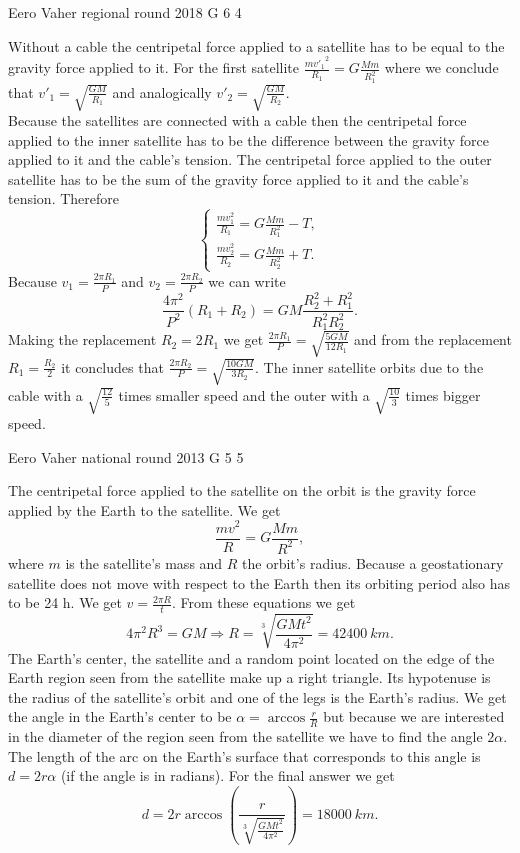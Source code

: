 \documentclass[11pt]{article}
\begin{document}
{Eero Vaher} %
{regional round} %
{2018} %
{G 6} %
{4} %
{

\ifEngSolution
Without a cable the centripetal force applied to a satellite has to be equal to the gravity force applied to it. For the first satellite $\frac{{mv'_1}^2}{R_1}=G\frac{Mm}{R_1^2}$ where we conclude that $v'_1=\sqrt{\frac{GM}{R_1}}$ and analogically $v'_2=\sqrt{\frac{GM}{R_2}}$.\\
Because the satellites are connected with a cable then the centripetal force applied to the inner satellite has to be the difference between the gravity force applied to it and the cable’s tension. The centripetal force applied to the outer satellite has to be the sum of the gravity force applied to it and the cable’s tension. Therefore
$$\begin{cases}
\frac{mv_1^2}{R_1}=G\frac{Mm}{R_1^2}-T,\\
\frac{mv_2^2}{R_2}=G\frac{Mm}{R_2^2}+T.
\end{cases}$$
Because $v_1=\frac{2\pi R_1}{P}$ and $v_2=\frac{2\pi R_2}{P}$ we can write 
$$\frac{4\pi^2}{P^2}\left(R_1+R_2\right)=GM\frac{R_2^2+R_1^2}{R_1^2R_2^2}.$$
Making the replacement $R_2=2R_1$ we get $\frac{2\pi R_1}{P}=\sqrt{\frac{5GM}{12R_1}}$ and from the replacement $R_1=\frac{R_2}{2}$ it concludes that $\frac{2\pi R_2}{P}=\sqrt{\frac{10GM}{3R_2}}$. The inner satellite orbits due to the cable with a $\sqrt{\frac{12}{5}}$ times smaller speed and the outer with a $\sqrt{\frac{10}{3}}$ times bigger speed.
\fi
}

{Eero Vaher} %
{national round} %
{2013} %
{G 5} %
{5} %
{

\ifEngSolution
The centripetal force applied to the satellite on the orbit is the gravity force applied by the Earth to the satellite. We get 
$$\frac{mv^2}{R}=G\frac{Mm}{R^2},$$
where $m$ is the satellite’s mass and $R$ the orbit’s radius. Because a geostationary satellite does not move with respect to the Earth then its orbiting period also has to be 24 h. We get $v=\frac{2\pi R}{t}$. From these equations we get
$$4\pi^2 R^3=GM \Rightarrow R=\sqrt[3]{\frac{GMt^2}{4\pi^2}}=\SI{42400}{km}.$$
The Earth’s center, the satellite and a random point located on the edge of the Earth region seen from the satellite make up a right triangle. Its hypotenuse is the radius of the satellite’s orbit and one of the legs is the Earth’s radius. We get the angle in the Earth’s center to be $\alpha=\arccos{\frac{r}{R}}$ but because we are interested in the diameter of the region seen from the satellite we have to find the angle $2\alpha$. The length of the arc on the Earth’s surface that corresponds to this angle is $d=2r\alpha$ (if the angle is in radians). For the final answer we get
$$d=2r\arccos \left(\frac{r}{\sqrt[3]{\frac{GMt^2}{4\pi^2}}}\right) =\SI{18000}{km}.$$
\fi
}
\end{document}
